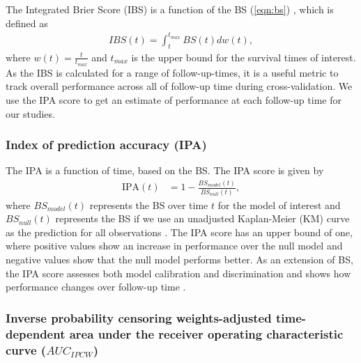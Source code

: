 \documentclass[preprint,12pt]{elsarticle}
\begin{document}
The Integrated Brier Score (IBS) is a function of the BS (\ref{eqn:bs}) \citep{graf1999}, which is defined as \begin{align*}
IBS(t)=\int_{t}^{t_{max}}BS(t)dw(t),
\end{align*} where $w(t)=\frac{t}{t_{max}}$ and $t_{max}$ is the upper bound for the survival times of interest. As the IBS is calculated for a range of follow-up-times,
it is a useful metric to track overall performance across all of follow-up time during cross-validation. We use the
IPA score to get an estimate of performance at each follow-up time for our studies.



\hypertarget{index-of-prediction-accuracy-ipa}{%
\subsubsection{Index of prediction accuracy (IPA)}\label{index-of-prediction-accuracy-ipa}}

The IPA is a function of time, based on the BS. The IPA score is given by \begin{align}
\textrm{IPA}(t) &= 1-\frac{BS_{model}(t)}{BS_{null}(t)}, \nonumber
\end{align} where \(BS_{model}(t)\) represents the BS over time \(t\) for the model of interest and \(BS_{null}(t)\) represents
the BS if we use an unadjusted Kaplan-Meier (KM) curve as the prediction for all observations \citep{kattan2018index}. The
IPA score has an upper bound of one, where positive values show an increase in performance over the null model and
negative values show that the null model performs better. As an extension of BS, the IPA score assesses both model calibration
and discrimination and shows how performance changes over follow-up time \citep{graf1999} \citep{kattan2018index}.




\hypertarget{auc}{%
\subsubsection{Inverse probability censoring weights-adjusted time-dependent area under the receiver operating characteristic curve ($AUC_{IPCW}$)}\label{auc}}
\end{document}
